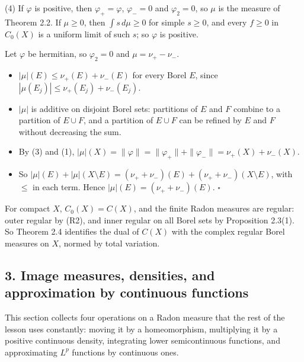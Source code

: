 \documentclass[
  english,
  11pt,
  a4paper,
]{article}
\providecommand{\tightlist}{%
  \setlength{\itemsep}{0pt}\setlength{\parskip}{0pt}}
\begin{document}
(4) If \(\varphi\) is positive, then \(\varphi_+=\varphi\),
\(\varphi_-=0\) and \(\varphi_2=0\), so \(\mu\) is the measure of
Theorem 2.2. If \(\mu\geq0\), then \(\int s\,d\mu\geq0\) for simple
\(s\geq0\), and every \(f\geq0\) in \(C_0(X)\) is a uniform limit of
such \(s\); so \(\varphi\) is positive.

Let \(\varphi\) be hermitian, so \(\varphi_2=0\) and
\(\mu=\nu_+-\nu_-\).

\begin{itemize}
\tightlist
\item
  \(|\mu|(E)\leq\nu_+(E)+\nu_-(E)\) for every Borel \(E\), since
  \(|\mu(E_j)|\leq\nu_+(E_j)+\nu_-(E_j)\).
\item
  \(|\mu|\) is additive on disjoint Borel sets: partitions of \(E\) and
  \(F\) combine to a partition of \(E\cup F\), and a partition of
  \(E\cup F\) can be refined by \(E\) and \(F\) without decreasing the
  sum.
\item
  By (3) and (1),
  \(|\mu|(X)=\|\varphi\|=\|\varphi_+\|+\|\varphi_-\|=\nu_+(X)+\nu_-(X)\).
\item
  So
  \(|\mu|(E)+|\mu|(X\setminus E)=(\nu_++\nu_-)(E)+(\nu_++\nu_-)(X\setminus E)\),
  with \(\leq\) in each term. Hence \(|\mu|(E)=(\nu_++\nu_-)(E)\).
  \(\square\)
\end{itemize}

For compact \(X\), \(C_0(X)=C(X)\), and the finite Radon measures are
regular: outer regular by (R2), and inner regular on all Borel sets by
Proposition 2.3(1). So Theorem 2.4 identifies the dual of \(C(X)\) with
the complex regular Borel measures on \(X\), normed by total variation.

\subsection[3. Image measures, densities, and approximation by
continuous
functions]{\texorpdfstring{\protect\hypertarget{haar-measure-on-locally-compact-groups--oa-fnd-hm-02}{}{}3.
Image measures, densities, and approximation by continuous
functions}{3. Image measures, densities, and approximation by continuous functions}}\label{haar-measure-on-locally-compact-groups--OA-FND-HM-02}

This section collects four operations on a Radon measure that the rest
of the lesson uses constantly: moving it by a homeomorphism, multiplying
it by a positive continuous density, integrating lower semicontinuous
functions, and approximating \(L^p\) functions by continuous ones.
\end{document}

